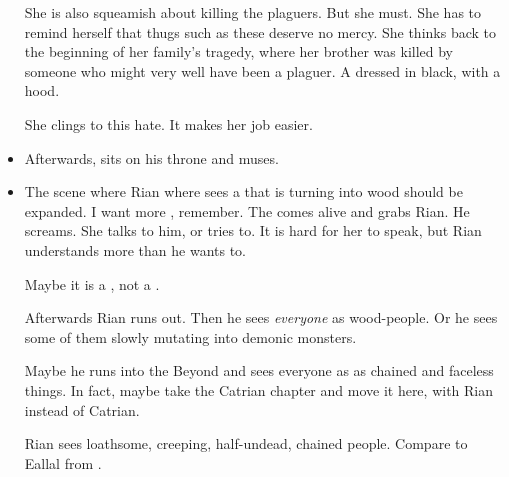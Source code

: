 \begin{changes}
\begin{itemize}
        She is also squeamish about killing the plaguers. 
        But she must. 
        She has to remind herself that thugs such as these deserve no mercy. 
        She thinks back to the beginning of her family's tragedy, where her brother was killed by someone who might very well have been a plaguer. 
        A \scatha{} dressed in black, with a hood. 
        
        She clings to this hate. 
        It makes her job easier. 
      \item 
        Afterwards, \Psyrex{} sits on his throne and muses. 
        \begin{prose}
        \end{prose}
      \item 
        The scene where Rian where sees a \sphyle that is turning into wood should be expanded.
        I want more , remember. 
        The \sphyle comes alive and grabs Rian. 
        He screams.
        She talks to him, or tries to.
        It is hard for her to speak, but Rian understands more than he wants to. 
        
        Maybe it is a \human, not a \scatha. 
        
        Afterwards Rian runs out.
        Then he sees \emph{everyone} as wood-people.
        Or he sees some of them slowly mutating into demonic monsters.
        
        Maybe he runs into the Beyond and sees everyone as as chained and faceless things.
        In fact, maybe take the Catrian chapter and move it here, with Rian instead of Catrian. 
        
        Rian sees loathsome, creeping, half-undead, chained people. 
        Compare to Eallal from \cite{RobertEHoward:TheShadowKingdom}. 
        
\end{itemize}
\end{changes}

